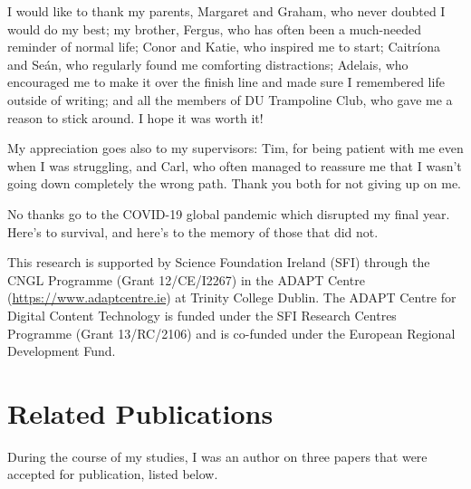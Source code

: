 \documentclass[a4paper,12pt,leqno]{article}
\begin{document}
I would like to thank my parents, Margaret and Graham, who never doubted I would do my best; my brother, Fergus, who has often been a much-needed reminder of normal life; Conor and Katie, who inspired me to start; Caitr\'{i}ona and Se\'{a}n, who regularly found me comforting distractions; Adelais, who encouraged me to make it over the finish line and made sure I remembered life outside of writing; and all the members of DU Trampoline Club, who gave me a reason to stick around. I hope it was worth it!

My appreciation goes also to my supervisors: Tim, for being patient with me even when I was struggling, and Carl, who often managed to reassure me that I wasn't going down completely the wrong path. Thank you both for not giving up on me.

No thanks go to the COVID-19 global pandemic which disrupted my final year. Here's to survival, and here's to the memory of those that did not.

This research is supported by Science Foundation Ireland (SFI) through the CNGL 
Programme (Grant 12/CE/I2267) in the ADAPT Centre 
(\url{https://www.adaptcentre.ie}) at Trinity College Dublin. The
ADAPT Centre for Digital Content Technology is funded under the SFI Research 
Centres Programme (Grant 13/RC/2106) and is co-funded under the European 
Regional Development Fund.


\newpage
\section*{Related Publications}
During the course of my studies, I was an author on three papers that were accepted for publication, listed below.
\end{document}
